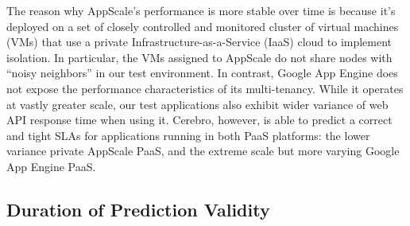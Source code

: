 The reason why AppScale's performance is more stable over time is because it's deployed on a set of closely controlled 
and monitored cluster of virtual machines (VMs) that use a private
Infrastructure-as-a-Service (IaaS) cloud to implement isolation.  In particular, the 
VMs assigned to AppScale do not share nodes with ``noisy neighbors'' in our
test environment.  In contrast, Google App Engine does not expose the
performance characteristics of its multi-tenancy.  While it operates at vastly
greater scale, our test applications also exhibit wider variance of web API
response time when using it.
Cerebro, however, is able to predict a correct and tight SLAs for applications
running in both PaaS platforms: the lower variance private
AppScale PaaS, and the extreme scale but more varying Google App Engine PaaS.

\subsection{Duration of Prediction Validity}

%

